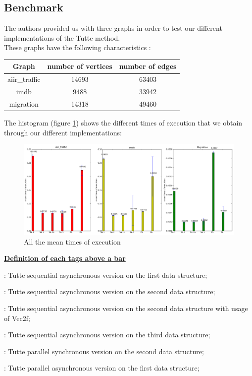 \subsection{Benchmark}

The authors provided us with three graphs in order to test our
different implementations of the Tutte method.\\

These graphs have the following characteristics :

\begin{center}
\begin{tabular}{|c|c|c|}
\hline
Graph & number of vertices & number of edges \\
\hline
aiir\_traffic & 14693 & 63403\\
imdb & 9488 & 33942\\
migration & 14318 & 49460\\
\hline
\end{tabular}
\end{center}


The histogram (figure \ref{histo}) shows the different times of execution
that we obtain through our different implementations:

\begin{figure}[!h]
  \centering
  \includegraphics[scale=0.4]{img/histogramme.png}
  \caption{All the mean times of execution}
  \label{histo}
\end{figure}

\underline{\bf Definition of each tags above a bar}
\begin{dinglist}{70}
\item [SA 1]: Tutte sequential asynchronous version on the first data structure;
\item [SA 2]: Tutte sequential asynchronous version on the second data structure;
\item [SA 2b]: Tutte sequential asynchronous version on the second data structure with usage of Vec2f;
\item [SA 3]: Tutte sequential asynchronous version on the third data structure;
\item [PS]: Tutte parallel synchronous version on the second data structure;
\item [PA]: Tutte parallel asynchronous version on the first data structure;
\end{dinglist}

